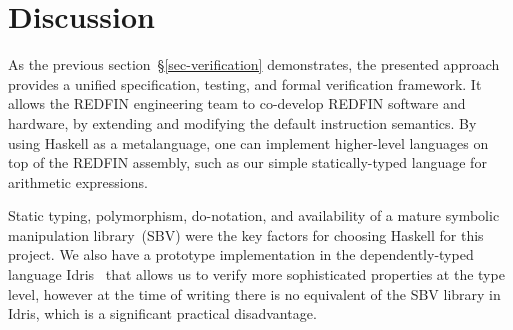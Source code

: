 \section{Discussion\label{sec-discussion}}




As the previous section~\S\ref{sec-verification} demonstrates, the presented
approach provides a unified specification, testing, and formal verification
framework. It allows the REDFIN engineering team to co-develop REDFIN software
and hardware, by extending and modifying the default instruction semantics.
By using Haskell as a metalanguage, one can implement higher-level languages on
top of the REDFIN assembly, such as our simple statically-typed language for
arithmetic expressions.

Static typing, polymorphism, \textsf{do}-notation, and availability of a mature
symbolic manipulation library~(SBV) were the key factors for choosing Haskell
for this project. We also have a prototype implementation in the
dependently-typed language Idris~\cite{JFP:9060502} that allows us to verify
more sophisticated properties at the type level, however at the time of writing
there is no equivalent of the SBV library in Idris, which is a significant
practical disadvantage.

